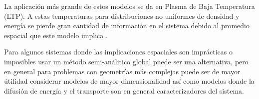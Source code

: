 La aplicaci\'on m\'as grande de estos modelos se da en Plasma de Baja Temperatura (LTP). A estas temperaturas para distribuciones no uniformes de densidad y energ\'ia se pierde gran cantidad de informaci\'on en el sistema debido al promedio espacial que este modelo implica \cite{hurlbatt2017}.

Para algunos sistemas donde las implicaciones espaciales son impr\'acticas o imposibles usar un m\'etodo semi-an\'alitico global puede ser una alternativa, pero en general para problemas con geometr\'ias m\'as complejas puede ser de mayor \'utilidad considerar modelos de mayor dimensionalidad as\'i como modelos donde la difusi\'on de energ\'ia y el transporte son en general caracterizadores del sistema. 
